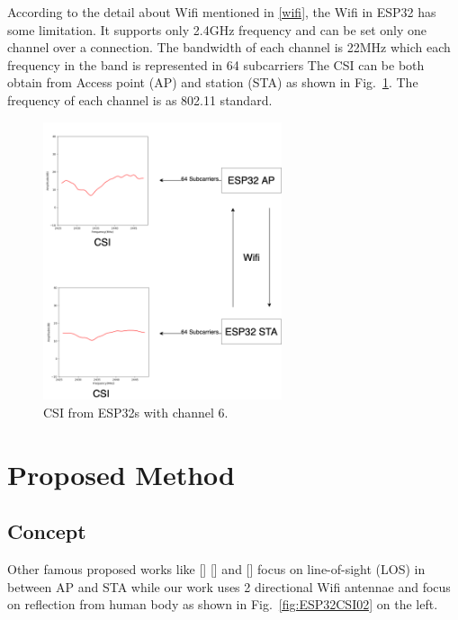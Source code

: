 \documentclass[conference]{IEEEtran}
\begin{document}
	According to the detail about Wifi mentioned in \ref{wifi}, the Wifi in ESP32 has some limitation. It supports only 2.4GHz frequency and can be set only one channel over a connection. The bandwidth of each channel is 22MHz which each frequency in the band is represented in 64 subcarriers 
	The CSI can be both obtain from Access point (AP) and station (STA) as shown in Fig.~\ref{fig:ESP32CSI01}.
	The frequency of each channel is as 802.11 standard.
	
	
	
	\begin{figure}[htbp]
		
		\centerline{\includegraphics[width=70mm,scale=0.5]{ESP32CSI01.png}}
		\caption{CSI from ESP32s with channel 6.}
		\label{fig:ESP32CSI01}
	\end{figure}
	

	\section{Proposed Method}
	
	\subsection{Concept}\label{AA}
	
	Other famous proposed works like [] [] and [] focus on line-of-sight (LOS) in between AP and STA while our work uses 2 directional Wifi antennae and focus on reflection from human body as shown in Fig.~\ref{fig:ESP32CSI02} on the left.
	
\end{document}
